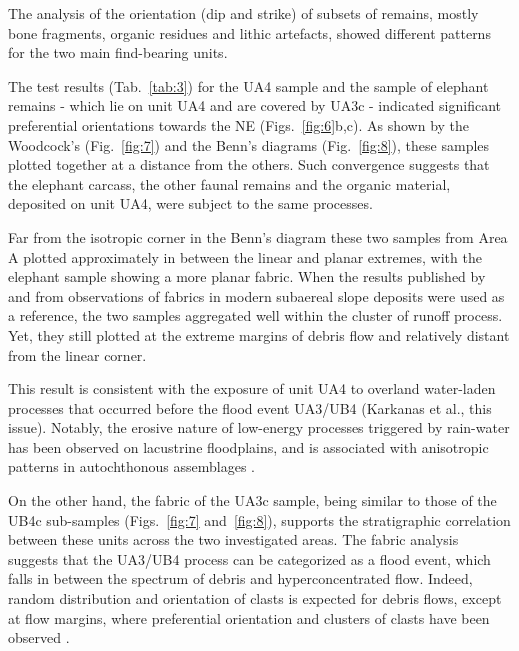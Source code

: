 \documentclass[preprint,authoryear,times]{elsarticle} %
\begin{document}
The analysis of the orientation (dip and strike) of subsets of remains, mostly bone fragments, organic residues and lithic artefacts, showed different patterns for the two main find-bearing units.


The test results (Tab.~\ref{tab:3}) for the UA4 sample and the sample of elephant remains - which lie on unit UA4 and are covered by UA3c - indicated significant preferential orientations towards the NE (Figs.~\ref{fig:6}b,c). As shown by the Woodcock's (Fig.~\ref{fig:7}) and the Benn's diagrams (Fig.~\ref{fig:8}), these samples plotted together at a distance from the others. Such convergence suggests that the elephant carcass, the other faunal remains and the organic material, deposited on unit UA4, were subject to the same processes.

Far from the isotropic corner in the Benn's diagram these two samples from Area A plotted approximately in between the linear and planar extremes, with the elephant sample showing a more planar fabric. When the results published by \cite{Bertran1997} and \cite{Lenoble2004} from observations of fabrics in modern subaereal slope deposits were used as a reference, the two samples aggregated well within the cluster of runoff process. Yet, they still plotted at the extreme margins of debris flow and relatively distant from the linear corner.

This result is consistent with the exposure of unit UA4 to overland water-laden processes that occurred before the flood event UA3/UB4 (Karkanas et al., this issue). Notably, the erosive nature of low-energy processes triggered by rain-water has been observed on lacustrine floodplains, and is associated with anisotropic patterns in autochthonous assemblages \citep{Cobo-Sanchez2014,Dominguez-Rodrigo2014,Garcia-Moreno2016}.

On the other hand, the fabric of the UA3c sample, being similar to those of the UB4c sub-samples (Figs.~\ref{fig:7} and~\ref{fig:8}), supports the stratigraphic correlation between these units across the two investigated areas. The fabric analysis suggests that the UA3/UB4 process can be categorized as a flood event, which falls in between the spectrum of debris and hyperconcentrated flow. Indeed, random distribution and orientation of clasts is expected for debris flows, except at flow margins, where preferential orientation and clusters of clasts have been observed \citep{Pierson2005}. %
\end{document}
